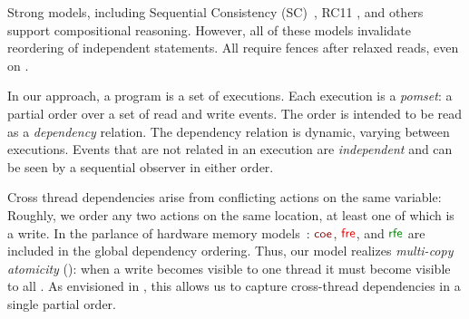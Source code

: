 

Strong models, including Sequential Consistency
(SC)~\citep{Lamport:1979:MMC:1311099.1311750}, RC11
\citep{DBLP:conf/pldi/LahavVKHD17}, and others
\citep{Dolan:2018:BDR:3192366.3192421,DBLP:conf/pldi/LahavVKHD17,DBLP:conf/lics/JeffreyR16,Boehm:2014:OGA:2618128.2618134}
support compositional reasoning.  However, all of these models invalidate
reordering of independent statements.  All require fences after relaxed
reads, even on \armeight.



In our approach, a program is a set of executions.  Each execution is a
\emph{pomset}: a partial order over a set of read and write events.  The
order is intended to be read as a \emph{dependency} relation.  The dependency
relation is dynamic, varying between executions.  Events that are not related
in an execution are \emph{independent} and can be seen by a sequential
observer in either order.

Cross thread dependencies arise from conflicting actions on the same
variable: Roughly, we order any two actions on the same location, at least
one of which is a write.  In the parlance of hardware memory
models~\citep{alglave}: $\rcoe$, $\rfre$, and $\rrfex$ are included in the
global dependency ordering.  Thus, our model realizes \emph{multi-copy
  atomicity} (\mca): when a write becomes visible to one thread it must
become visible to all
\citep{DBLP:journals/pacmpl/PulteFDFSS18}.  As envisioned in
\cite[]{AlglaveThesis}, this allows us to capture cross-thread
dependencies in a single partial order.

